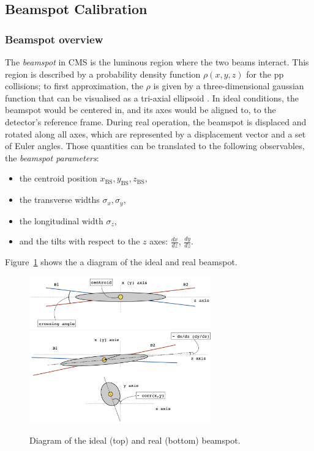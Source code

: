 \subsection{Beamspot Calibration}

\subsubsection{Beamspot overview}

The \emph{beamspot} in CMS is the luminous region where the two beams interact.
This region is described by a probability density function $\rho(x,y,z)$ for the pp collisions;
to first approximation, the $\rho$ is given by a three-dimensional gaussian function that can be visualised as a tri-axial ellipsoid \cite{CMS-PAS-TRK-10-005}.
In ideal conditions, the beamspot would be centered in,
and its axes would be aligned to,
to the detector's reference frame.
During real operation, the beamspot is displaced and rotated along all axes,
which are represented by a displacement vector and a set of Euler angles.
Those quantities can be translated to the following observables, the \emph{beamspot parameters}:
\begin{itemize}
\item the centroid position $x_{\text{BS}}, y_{\text{BS}}, z_{\text{BS}}$,
\item the transverse widths $\sigma_{x}, \sigma_{y}$,
\item the longitudinal width $\sigma_{z}$,
\item and the tilts with respect to the $z$ axes: $\frac{dx}{dz}$, $\frac{dy}{dz}$.
\end{itemize}
Figure~\ref{fig:beamspotCartoon} shows the a diagram of the ideal and real beamspot.
\begin{figure}[htbp]
   \centering
\includegraphics[width=0.7\textwidth]{figures/IdealBeamspot.png}\\[2ex]
\includegraphics[width=0.7\textwidth]{figures/RealBeamspot.png}
   \caption{Diagram of the ideal (top) and real (bottom) beamspot.}
   \label{fig:beamspotCartoon}
\end{figure}

